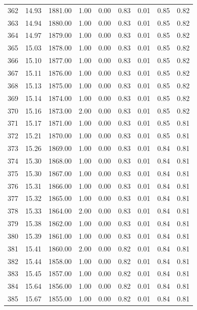\documentclass{article}\usepackage[]{graphicx}\usepackage[]{color}
\begin{document}
\begin{longtable}{rrrrrrrrr}
  362 & 14.93 & 1881.00 & 1.00 & 0.00 & 0.83 & 0.01 & 0.85 & 0.82 \\ 
  363 & 14.94 & 1880.00 & 1.00 & 0.00 & 0.83 & 0.01 & 0.85 & 0.82 \\ 
  364 & 14.97 & 1879.00 & 1.00 & 0.00 & 0.83 & 0.01 & 0.85 & 0.82 \\ 
  365 & 15.03 & 1878.00 & 1.00 & 0.00 & 0.83 & 0.01 & 0.85 & 0.82 \\ 
  366 & 15.10 & 1877.00 & 1.00 & 0.00 & 0.83 & 0.01 & 0.85 & 0.82 \\ 
  367 & 15.11 & 1876.00 & 1.00 & 0.00 & 0.83 & 0.01 & 0.85 & 0.82 \\ 
  368 & 15.13 & 1875.00 & 1.00 & 0.00 & 0.83 & 0.01 & 0.85 & 0.82 \\ 
  369 & 15.14 & 1874.00 & 1.00 & 0.00 & 0.83 & 0.01 & 0.85 & 0.82 \\ 
  370 & 15.16 & 1873.00 & 2.00 & 0.00 & 0.83 & 0.01 & 0.85 & 0.82 \\ 
  371 & 15.17 & 1871.00 & 1.00 & 0.00 & 0.83 & 0.01 & 0.85 & 0.81 \\ 
  372 & 15.21 & 1870.00 & 1.00 & 0.00 & 0.83 & 0.01 & 0.85 & 0.81 \\ 
  373 & 15.26 & 1869.00 & 1.00 & 0.00 & 0.83 & 0.01 & 0.84 & 0.81 \\ 
  374 & 15.30 & 1868.00 & 1.00 & 0.00 & 0.83 & 0.01 & 0.84 & 0.81 \\ 
  375 & 15.30 & 1867.00 & 1.00 & 0.00 & 0.83 & 0.01 & 0.84 & 0.81 \\ 
  376 & 15.31 & 1866.00 & 1.00 & 0.00 & 0.83 & 0.01 & 0.84 & 0.81 \\ 
  377 & 15.32 & 1865.00 & 1.00 & 0.00 & 0.83 & 0.01 & 0.84 & 0.81 \\ 
  378 & 15.33 & 1864.00 & 2.00 & 0.00 & 0.83 & 0.01 & 0.84 & 0.81 \\ 
  379 & 15.38 & 1862.00 & 1.00 & 0.00 & 0.83 & 0.01 & 0.84 & 0.81 \\ 
  380 & 15.39 & 1861.00 & 1.00 & 0.00 & 0.83 & 0.01 & 0.84 & 0.81 \\ 
  381 & 15.41 & 1860.00 & 2.00 & 0.00 & 0.82 & 0.01 & 0.84 & 0.81 \\ 
  382 & 15.44 & 1858.00 & 1.00 & 0.00 & 0.82 & 0.01 & 0.84 & 0.81 \\ 
  383 & 15.45 & 1857.00 & 1.00 & 0.00 & 0.82 & 0.01 & 0.84 & 0.81 \\ 
  384 & 15.64 & 1856.00 & 1.00 & 0.00 & 0.82 & 0.01 & 0.84 & 0.81 \\ 
  385 & 15.67 & 1855.00 & 1.00 & 0.00 & 0.82 & 0.01 & 0.84 & 0.81 \\ 

\end{longtable}
\end{document}
